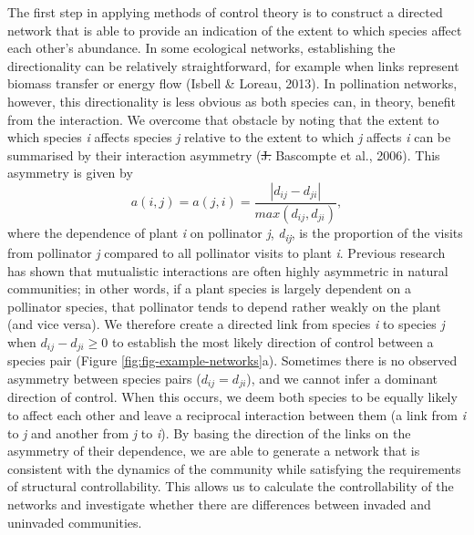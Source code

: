 \documentclass[a4paper]{artikel1}
\theoremstyle{definition}
\theoremstyle{definition}
\theoremstyle{definition}
\theoremstyle{remark}
\providecommand{\DIFdeltex}[1]{{\protect\color{red}\sout{#1}}}                      %
\providecommand{\DIFdelbegin}{} %
\providecommand{\DIFdelend}{} %
\providecommand{\DIFdel}[1]{\texorpdfstring{\DIFdeltex{#1}}{}} %
\begin{document}
The first step in applying methods of control theory is to construct a
directed network that is able to provide an indication of the extent to
which species affect each other's abundance. In some ecological
networks, establishing the directionality can be relatively
straightforward, for example when links represent biomass transfer or
energy flow (Isbell \& Loreau, 2013). In pollination networks, however,
this directionality is less obvious as both species can, in theory,
benefit from the interaction. We overcome that obstacle by noting that
the extent to which species \emph{i} affects species \emph{j} relative
to the extent to which \emph{j} affects \emph{i} can be summarised by
their interaction asymmetry (\DIFdelbegin \DIFdel{J. }\DIFdelend Bascompte et al., 2006). This asymmetry is
given by
\[a(i,j) = a(j,i) = \frac{\left | d_{ij}-d_{ji} \right |}{max\left ( d_{ij}, d_{ji} \right )},\]
where the dependence of plant \emph{i} on pollinator \emph{j},
\emph{d\textsubscript{ij}}, is the proportion of the visits from
pollinator \emph{j} compared to all pollinator visits to plant \emph{i}.
Previous research has shown that mutualistic interactions are often
highly asymmetric in natural communities; in other words, if a plant
species is largely dependent on a pollinator species, that pollinator
tends to depend rather weakly on the plant (and vice versa). We
therefore create a directed link from species \emph{i} to species
\emph{j} when \(d_{ij}-d_{ji} \geq 0\) to establish the most likely
direction of control between a species pair (Figure
\ref{fig:fig-example-networks}a). Sometimes there is no observed
asymmetry between species pairs (\(d_{ij}=d_{ji}\)), and we cannot infer
a dominant direction of control. When this occurs, we deem both species
to be equally likely to affect each other and leave a reciprocal
interaction between them (a link from \emph{i} to \emph{j} and another
from \emph{j} to \emph{i}). By basing the direction of the links on the
asymmetry of their dependence, we are able to generate a network that is
consistent with the dynamics of the community while satisfying the
requirements of structural controllability. This allows us to calculate
the controllability of the networks and investigate whether there are
differences between invaded and uninvaded communities.
\end{document}
